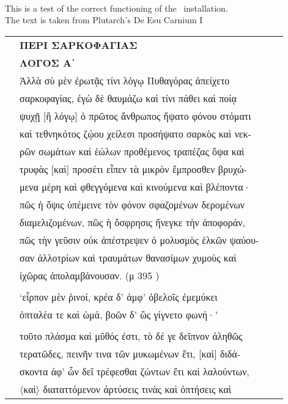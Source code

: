 \documentclass[a4paper,12pt]{article}
\begin{document}
\begin{center}
\greek
{}
\\
\vspace*{5mm}
\latin
{\footnotesize This is a test of the correct functioning of the \XeLaTeX\ installation.}
\\
{\tiny The text is taken from Plutarch᾽s De Esu Carnium I}
\end{center}
\greek
{}
\begin{center}
\begin{xtabular}{p{1cm}p{10.5454545454545cm}p{0.8cm}p{0cm}}
&\textbf{ΠΕΡΙ ΣΑΡΚΟΦΑΓΙΑΣ} &&\\
&\textbf{ΛΟΓΟΣ Αʹ} &&\\
&Ἀλλὰ σὺ μὲν ἐρωτᾷς τίνι λόγῳ Πυθαγόρας ἀπείχετο &&\\
&σαρκοφαγίας, ἐγὼ δὲ θαυμάζω καὶ τίνι πάθει καὶ ποίᾳ &&\\
&ψυχῇ [ἢ λόγῳ] ὁ πρῶτος ἄνθρωπος ἥψατο φόνου στόματι &&\\
&καὶ τεθνηκότος ζῴου χείλεσι προσήψατο σαρκὸς καὶ νεκ-&&\\
&ρῶν σωμάτων καὶ ἑώλων προθέμενος τραπέζας ὄψα καὶ &&\\
&τρυφὰς [καὶ] προσέτι εἶπεν τὰ μικρὸν ἔμπροσθεν βρυχώ-&&\\
&μενα μέρη καὶ φθεγγόμενα καὶ κινούμενα καὶ βλέποντα·  &&\\
&πῶς ἡ ὄψις ὑπέμεινε τὸν φόνον σφαζομένων δερομένων &&\\
&διαμελιζομένων, πῶς ἡ ὄσφρησις ἤνεγκε τὴν ἀποφοράν, &&\\
&πῶς τὴν γεῦσιν οὐκ ἀπέστρεψεν ὁ μολυσμὸς ἑλκῶν ψαύου-&&\\
&σαν ἀλλοτρίων καὶ τραυμάτων θανασίμων χυμοὺς καὶ &&\\
&ἰχῶρας ἀπολαμβάνουσαν. (μ  \latin{}395 \greek{}) &&\\
&
 &&\\
&‘εἷρπον μὲν ῥινοί, κρέα δ’ ἀμφ’ ὀβελοῖς ἐμεμύκει &&\\
&ὀπταλέα τε καὶ ὠμά, βοῶν δ’ ὣς γίγνετο φωνή·’ &&\\
&
 &&\\
&τοῦτο πλάσμα καὶ μῦθός ἐστι, τὸ δέ γε δεῖπνον ἀληθῶς &&\\
&τερατῶδες, πεινῆν τινα τῶν μυκωμένων ἔτι, [καὶ] διδά-&&\\
&σκοντα ἀφ’ ὧν δεῖ τρέφεσθαι ζώντων ἔτι καὶ λαλούντων, &&\\
&〈καὶ〉 διαταττόμενον ἀρτύσεις τινὰς καὶ ὀπτήσεις καὶ &&\\

\end{xtabular}
\end{center}
\end{document}
